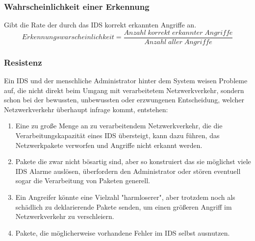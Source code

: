 \subsubsection{Wahrscheinlichkeit einer Erkennung}
Gibt die Rate der durch das IDS korrekt erkannten Angriffe an.\\
\[Erkennungswarscheinlichkeit  = \frac{Anzahl\;korrekt\;erkannter\;Angriffe} {Anzahl\;aller\;Angriffe}\]
\subsubsection{Resistenz}
Ein IDS und der menschliche Administrator hinter dem System weisen Probleme auf, die nicht direkt beim Umgang mit verarbeitetem Netzwerkverkehr, sondern schon bei der bewussten, unbewussten oder erzwungenen Entscheidung, welcher Netzwerkverkehr überhaupt infrage kommt, entstehen:
\begin{enumerate}
\item{Eine zu große Menge an zu verarbeitendem Netzwerkverkehr, die die Verarbeitungskapazität eines IDS übersteigt, kann dazu führen, das Netzwerkpakete verworfen und Angriffe nicht erkannt werden.}
\item{Pakete die zwar nicht bösartig sind, aber so konstruiert das sie möglichst viele IDS Alarme auslösen, überfordern den Administrator oder stören eventuell sogar die Verarbeitung von Paketen generell. }
\item{Ein Angreifer könnte eine Vielzahl "harmloserer", aber trotzdem noch als schädlich zu deklarierende Pakete senden, um einen größeren Angriff im Netzwerkverkehr zu verschleiern.}
\item{Pakete, die möglicherweise vorhandene Fehler im IDS selbst ausnutzen.}
\end{enumerate}
